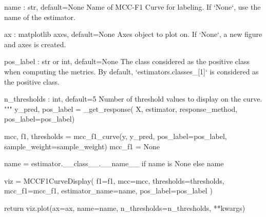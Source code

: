 \begin{pythoncode}
    name : str, default=None
        Name of MCC-F1 Curve for labeling. If `None`, use the name of the
        estimator.

    ax : matplotlib axes, default=None
        Axes object to plot on. If `None`, a new figure and axes is created.

    pos_label : str or int, default=None
        The class considered as the positive class when computing the metrics.
        By default, `estimators.classes_[1]` is considered as the positive
        class.

    n_thresholds : int, default=5
        Number of threshold values to display on the curve.
    """
    y_pred, pos_label = _get_response(
        X, estimator, response_method, pos_label=pos_label)

    mcc, f1, thresholds = mcc_f1_curve(y, y_pred, pos_label=pos_label,
                                       sample_weight=sample_weight)
    mcc_f1 = None

    name = estimator.__class__.__name__ if name is None else name

    viz = MCCF1CurveDisplay(
        f1=f1,
        mcc=mcc,
        thresholds=thresholds,
        mcc_f1=mcc_f1,
        estimator_name=name,
        pos_label=pos_label
    )

    return viz.plot(ax=ax, name=name, n_thresholds=n_thresholds, **kwargs)
\end{pythoncode}

